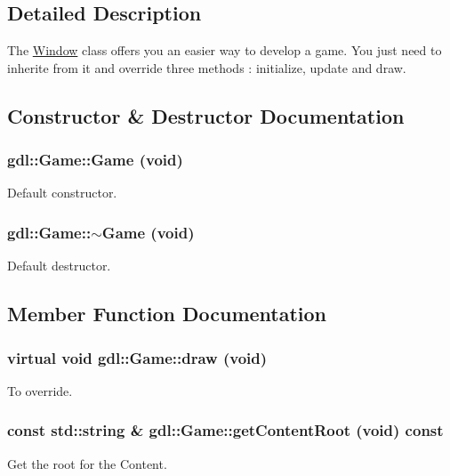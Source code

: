 \subsection{Detailed Description}
The \hyperlink{classgdl_1_1Window}{Window} class offers you an easier way to develop a game. You just need to inherite from it and override three methods : initialize, update and draw. 

\subsection{Constructor \& Destructor Documentation}
\hypertarget{classgdl_1_1Game_a6e82a8942734638e0f78f7308c0950fe}{
\subsubsection[{Game}]{\setlength{\rightskip}{0pt plus 5cm}gdl::Game::Game (void)}}
\label{classgdl_1_1Game_a6e82a8942734638e0f78f7308c0950fe}
Default constructor. \hypertarget{classgdl_1_1Game_a39acbe13be273b85570619bfff2f6135}{
\subsubsection[{$\sim$Game}]{\setlength{\rightskip}{0pt plus 5cm}gdl::Game::$\sim$Game (void)}}
\label{classgdl_1_1Game_a39acbe13be273b85570619bfff2f6135}
Default destructor. 

\subsection{Member Function Documentation}
\hypertarget{classgdl_1_1Game_af09f81ba22b7c297fa2da73cd3fce8c5}{
\subsubsection[{draw}]{\setlength{\rightskip}{0pt plus 5cm}virtual void gdl::Game::draw (void)}}
\label{classgdl_1_1Game_af09f81ba22b7c297fa2da73cd3fce8c5}
To override. \hypertarget{classgdl_1_1Game_ad487d5d6e94f2e4d7bcfaf57626d93d4}{
\subsubsection[{getContentRoot}]{\setlength{\rightskip}{0pt plus 5cm}const std::string \& gdl::Game::getContentRoot (void) const}}
\label{classgdl_1_1Game_ad487d5d6e94f2e4d7bcfaf57626d93d4}
Get the root for the Content.

